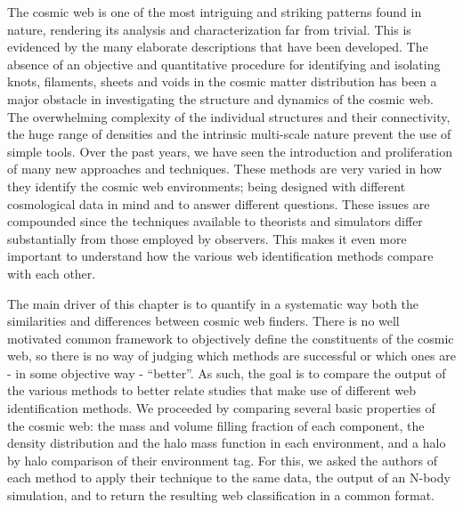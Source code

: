 The cosmic web is one of the most intriguing and striking patterns found in nature, rendering
its analysis and characterization far from trivial. This is evidenced by the many elaborate
descriptions that have been developed. The absence of an objective and quantitative procedure for identifying and isolating knots, filaments, sheets and voids in the cosmic matter distribution has been a major obstacle in investigating the structure and dynamics of the cosmic web. The overwhelming complexity of the individual structures and their connectivity, the huge range of densities and the intrinsic multi-scale nature prevent the use of simple tools. Over the past years, we have seen the introduction and proliferation of many new approaches and techniques. These methods are very varied in how they identify the cosmic web environments; being designed with different cosmological data in mind and to answer different questions. These issues are compounded since the techniques available to theorists and simulators differ substantially from those employed by observers. This makes it even more important to understand how the various web identification methods compare with each other.


The main driver of this chapter is to quantify in a systematic way both the similarities and differences between cosmic web finders. There is no well motivated common framework to objectively define the constituents of the cosmic web, so there is no way of judging which methods are successful or which ones are  - in some objective way - ``better''. As such, the goal is to compare the output of the various methods to better relate studies that make use of different web identification methods. We proceeded by comparing several basic properties of the cosmic web: the mass and volume filling fraction of each component, the density distribution and the halo mass function in each environment, and a halo by halo comparison of their environment tag. For this, we asked the authors of each method to apply their technique to the same data, the output of an N-body simulation, and to return the resulting web classification in a common format.


